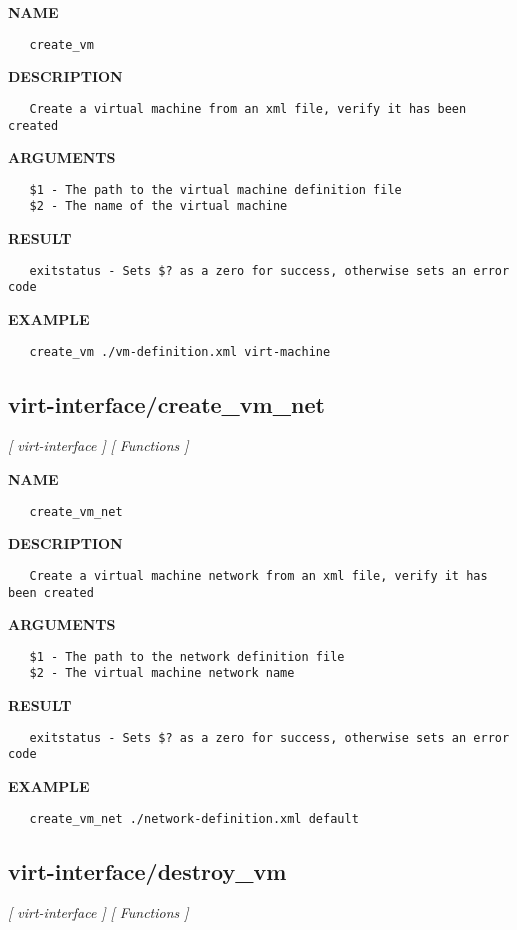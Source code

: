 \label{ch:robo34}
\label{ch:virt_interface_create_vm}
\textbf{NAME}
\begin{verbatim}
   create_vm
\end{verbatim}
\textbf{DESCRIPTION}
\begin{verbatim}
   Create a virtual machine from an xml file, verify it has been created 
\end{verbatim}
\textbf{ARGUMENTS}
\begin{verbatim}
   $1 - The path to the virtual machine definition file
   $2 - The name of the virtual machine
\end{verbatim}
\textbf{RESULT}
\begin{verbatim}
   exitstatus - Sets $? as a zero for success, otherwise sets an error code
\end{verbatim}
\textbf{EXAMPLE}
\begin{verbatim}
   create_vm ./vm-definition.xml virt-machine
\end{verbatim}
\newpage
\subsection{virt-interface/create\_vm\_net}
\textsl{[ virt-interface ]}
\textsl{[ Functions ]}

\label{ch:robo35}
\label{ch:virt_interface_create_vm_net}
\textbf{NAME}
\begin{verbatim}
   create_vm_net
\end{verbatim}
\textbf{DESCRIPTION}
\begin{verbatim}
   Create a virtual machine network from an xml file, verify it has been created 
\end{verbatim}
\textbf{ARGUMENTS}
\begin{verbatim}
   $1 - The path to the network definition file
   $2 - The virtual machine network name
\end{verbatim}
\textbf{RESULT}
\begin{verbatim}
   exitstatus - Sets $? as a zero for success, otherwise sets an error code
\end{verbatim}
\textbf{EXAMPLE}
\begin{verbatim}
   create_vm_net ./network-definition.xml default
\end{verbatim}
\newpage
\subsection{virt-interface/destroy\_vm}
\textsl{[ virt-interface ]}
\textsl{[ Functions ]}

